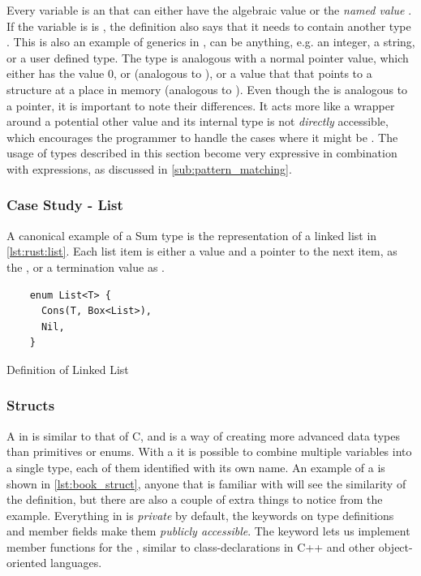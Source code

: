 Every  variable is an {\enum} that can either have the algebraic value  or the \emph{named value} .
If the variable is is , the definition also says that it needs to contain another type .
This is also an example of generics in {\rust},  can be anything, e.g. an integer, a string, or a user defined type.
The  type is analogous with a normal {\C} pointer value, which either has the value 0, or  (analogous to ), or a value that that points to a structure at a place in memory (analogous to ).
Even though the  is analogous to a {\C} pointer, it is important to note their differences.
It acts more like a wrapper around a potential other value and its internal type is not \emph{directly} accessible, which encourages the programmer to handle the cases where it might be .
The usage of {\enum} types described in this section become very expressive in combination with  expressions, as discussed in \autoref{sub:pattern_matching}.

\subsubsection{Case Study - List}

A canonical example of a Sum type is the representation of a linked list in \autoref{lst:rust:list}.
Each list item is either a value and a pointer to the next item, as the , or a termination value as .

\begin{listing}[H]
  \begin{verbatim}
    enum List<T> {
      Cons(T, Box<List>),
      Nil,
    }
  \end{verbatim}
  \caption{Definition of Linked List}
  \label{lst:rust:list}
\end{listing}

\subsubsection{Structs}
\label{ssub:structs}

A  in {\rust} is similar to that of C, and is a way of creating more advanced data types than primitives or enums.
With a  it is possible to combine multiple variables into a single type, each of them identified with its own name.
An example of a  is shown in \autoref{lst:book_struct}, anyone that is familiar with {\C} will see the similarity of the  definition, but there are also a couple of extra things to notice from the example.
Everything in {\rust} is \emph{private} by default, the  keywords on type definitions and member fields make them \emph{publicly accessible}.
The  keyword lets us implement member functions for the , similar to class-declarations in C++ and other object-oriented languages.

